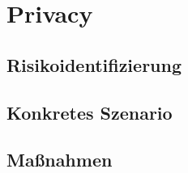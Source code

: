 \section{Privacy}

\subsection{Risikoidentifizierung}
\subsection{Konkretes Szenario}
\subsection{Maßnahmen}